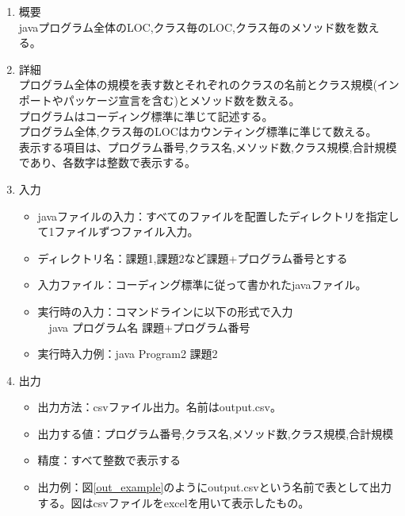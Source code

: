 \documentclass[titlepage,a4paper,12pt]{ltjsreport}
\begin{document}

\begin{enumerate}
    \item 概要 \mbox{}\\
    javaプログラム全体のLOC,クラス毎のLOC,クラス毎のメソッド数を数える。\\


    \item 詳細\mbox{}\\
    プログラム全体の規模を表す数とそれぞれのクラスの名前とクラス規模(インポートやパッケージ宣言を含む)とメソッド数を数える。\\
    プログラムはコーディング標準に準じて記述する。\\
    プログラム全体,クラス毎のLOCはカウンティング標準に準じて数える。\\


    表示する項目は、プログラム番号,クラス名,メソッド数,クラス規模,合計規模であり、各数字は整数で表示する。

    \item 入力\mbox{}\\
    
    \begin{itemize}
        \item javaファイルの入力：すべてのファイルを配置したディレクトリを指定して1ファイルずつファイル入力。
        \item ディレクトリ名：課題1,課題2など課題+プログラム番号とする
        \item 入力ファイル：コーディング標準に従って書かれたjavaファイル。
        
        \item 実行時の入力：コマンドラインに以下の形式で入力\\
        　java プログラム名 課題+プログラム番号
        \item 実行時入力例：java Program2 課題2

    \end{itemize}


    \item 出力\mbox{}\\
    \begin{itemize}
        \item 出力方法：csvファイル出力。名前はoutput.csv。
        \item 出力する値：プログラム番号,クラス名,メソッド数,クラス規模,合計規模
        \item 精度：すべて整数で表示する
        \item 出力例：図\ref{out_example}のようにoutput.csvという名前で表として出力する。図はcsvファイルをexcelを用いて表示したもの。
        

\end{itemize}
\end{enumerate}
\end{document}
